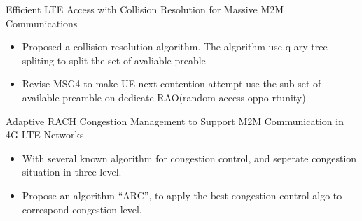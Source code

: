\documentclass{beamer}
\begin{document}
\begin{frame}{Efficient LTE Access with Collision Resolution for Massive M2M Communications}
    \begin{itemize}
            \item {Proposed a collision resolution algorithm. The algorithm use q-ary tree spliting to split the set of avaliable preable}
            \item {Revise MSG4 to make UE next contention attempt use the sub-set of available preamble on dedicate RAO(random access oppo
            rtunity)}
    \end{itemize}
\end{frame}

\begin{frame}{Adaptive RACH Congestion Management to Support M2M Communication in 4G LTE Networks}
    \begin{itemize}
            \item {With several known algorithm for congestion control, and seperate congestion situation in three level.}
            \item {Propose an algorithm ``ARC'', to apply the best congestion control algo to correspond congestion level.}
    \end{itemize}
\end{frame}

\end{document}
